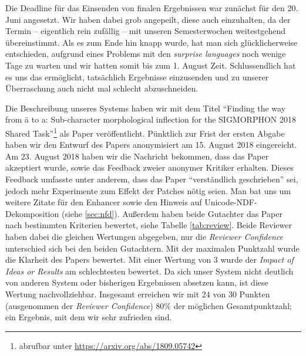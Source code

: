 \documentclass[11pt,a4paper]{article}
\begin{document}
Die Deadline für das Einsenden von finalen Ergebnissen war zunächst für den 20. Juni angesetzt. Wir haben dabei grob angepeilt, diese auch einzuhalten, da der Termin -- eigentlich rein zufällig -- mit unseren Semesterwochen weitestgehend übereinstimmt. Als es zum Ende hin knapp wurde, hat man sich glücklicherweise entschieden, aufgrund eines Problems mit den \textit{surprise languages} noch wenige Tage zu warten und wir hatten somit bis zum 1. August Zeit. Schlussendlich hat es uns das ermöglicht, tatsächlich Ergebnisse einzusenden und zu unserer Überraschung auch nicht mal schlecht abzuschneiden.

Die Beschreibung unseres Systems haben wir mit dem Titel \enquote{Finding the way from ä to a: Sub-character morphological inflection for the SIGMORPHON 2018 Shared Task}\footnote{abrufbar unter \url{https://arxiv.org/abs/1809.05742}} als Paper veröffentlicht.
Pünktlich zur Frist der ersten Abgabe haben wir den Entwurf des Papers anonymisiert am 15. August 2018 eingereicht.
Am 23. August 2018 haben wir die Nachricht bekommen, dass das Paper akzeptiert wurde, sowie das Feedback zweier anonymer Kritiker erhalten.
Dieses Feedback umfasste unter anderem, dass das Paper \enquote{verständlich geschrieben} sei, jedoch mehr Experimente zum Effekt der Patches nötig seien. Man bat uns um weitere Zitate für den Enhancer sowie den Hinweis auf Unicode-NDF-Dekomposition (siehe \autoref{sec:nfd}).
Außerdem haben beide Gutachter das Paper nach bestimmten Kriterien bewertet, siehe Tabelle \ref{tab:review}.
Beide Reviewer haben dabei die gleichen Wertungen abgegeben, nur die \textit{Reviewer Confidence} unterschied sich bei den beiden Gutachtern.
Mit der maximalen Punktzahl wurde die Klarheit des Papers bewertet.
Mit einer Wertung von $3$ wurde der \textit{Impact of Ideas or Results} am schlechtesten bewertet.
Da sich unser System nicht deutlich von anderen System oder bisherigen Ergebnissen absetzen kann, ist diese Wertung nachvollziehbar.
Insgesamt erreichen wir mit $24$ von $30$ Punkten (ausgenommen der \textit{Reviewer Confidence}) $80\%$ der möglichen Gesamtpunktzahl; ein Ergebnis, mit dem wir sehr zufrieden sind.
\end{document}
